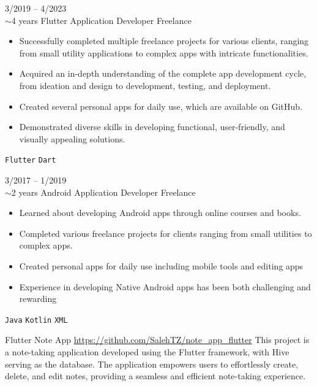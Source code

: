 \documentclass[9pt]{developercv} %
\begin{document}
\begin{entrylist}
	\entry
	{3/2019 -- 4/2023 \\\footnotesize{$\sim$4 years}}
	{Flutter Application Developer}
	{Freelance}
	{\vspace{-10pt}
		\begin{itemize}[noitemsep,topsep=0pt,parsep=0pt,partopsep=0pt, leftmargin=-1pt]
			\item Successfully completed multiple freelance projects for various clients, ranging from small utility applications to complex apps with intricate functionalities.
			\item Acquired an in-depth understanding of the complete app development cycle, from ideation and design to development, testing, and deployment.
			\item Created several personal apps for daily use, which are available on GitHub.
			\item Demonstrated diverse skills in developing functional, user-friendly, and visually appealing solutions.
		\end{itemize}
		\texttt{Flutter} \slashsep \texttt{Dart}}
	\entry
	{3/2017 -- 1/2019 \\\footnotesize{$\sim$2 years}}
	{Android Application Developer}
	{Freelance}
	{\vspace{-10pt}
		\begin{itemize}[noitemsep,topsep=0pt,parsep=0pt,partopsep=0pt, leftmargin=-1pt]
			\item Learned about developing Android apps through online courses and books.
			\item Completed various freelance projects for clients ranging from small utilities to complex apps.
			\item Created personal apps for daily use including mobile tools and editing apps
			\item Experience in developing Native Android apps has been both challenging and rewarding
		\end{itemize}
		\texttt{Java} \slashsep \texttt{Kotlin} \slashsep \texttt{XML}}
\end{entrylist}

\begin{entrylist}
	\entry
	{Flutter}
	{Note App}
	{\url{https://github.com/SalehTZ/note_app_flutter}}
	{
		This project is a note-taking application developed using the Flutter framework, with Hive serving as the database. The application empowers users to effortlessly create, delete, and edit notes, providing a seamless and efficient note-taking experience.
	}
\end{entrylist}
\end{document}
